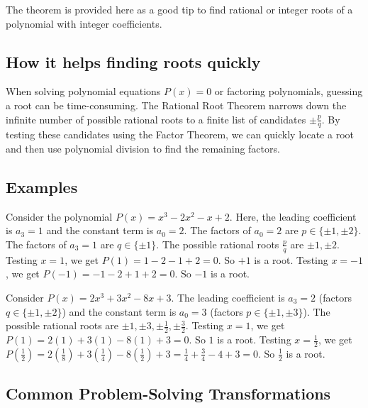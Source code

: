 \documentclass[12pt]{article}
\newenvironment{example}[1][]{%
  \begin{examplebox}[title={\bfseries Example~\thetcbcounter\ifx\relax#1\relax\else\ (#1)\fi}]%
}{%
  \end{examplebox}%
}
\begin{document}
The theorem is provided here as a good tip to find rational or integer roots of a polynomial with integer coefficients.

\subsection*{How it helps finding roots quickly}

When solving polynomial equations $P(x) = 0$ or factoring polynomials, guessing a root can be time-consuming. The Rational Root Theorem narrows down the infinite number of possible rational roots to a finite list of candidates $\pm \frac{p}{q}$. By testing these candidates using the Factor Theorem, we can quickly locate a root and then use polynomial division to find the remaining factors.

\subsection*{Examples}
\begin{example}[Simple Roots]
Consider the polynomial $P(x) = x^3 - 2x^2 - x + 2$. 
Here, the leading coefficient is $a_3 = 1$ and the constant term is $a_0 = 2$.
The factors of $a_0 = 2$ are $p \in \{\pm 1, \pm 2\}$.
The factors of $a_3 = 1$ are $q \in \{\pm 1\}$.
The possible rational roots $\frac{p}{q}$ are $\pm 1, \pm 2$.
Testing $x = 1$, we get $P(1) = 1 - 2 - 1 + 2 = 0$. So $+1$ is a root. 
Testing $x = -1$, we get $P(-1) = -1 - 2 + 1 + 2 = 0$. So $-1$ is a root.
\end{example}

\begin{example}[Fractional Roots]
Consider $P(x) = 2x^3 + 3x^2 - 8x + 3$.
The leading coefficient is $a_3 = 2$ (factors $q \in \{\pm 1, \pm 2\}$) and the constant term is $a_0 = 3$ (factors $p \in \{\pm 1, \pm 3\}$).
The possible rational roots are $\pm 1, \pm 3, \pm \frac{1}{2}, \pm \frac{3}{2}$.
Testing $x = 1$, we get $P(1) = 2(1) + 3(1) - 8(1) + 3 = 0$. So $1$ is a root.
Testing $x = \frac{1}{2}$, we get $P\left(\frac{1}{2}\right) = 2\left(\frac{1}{8}\right) + 3\left(\frac{1}{4}\right) - 8\left(\frac{1}{2}\right) + 3 = \frac{1}{4} + \frac{3}{4} - 4 + 3 = 0$. So $\frac{1}{2}$ is a root.
\end{example}

\subsection{Common Problem-Solving Transformations}
\end{document}
